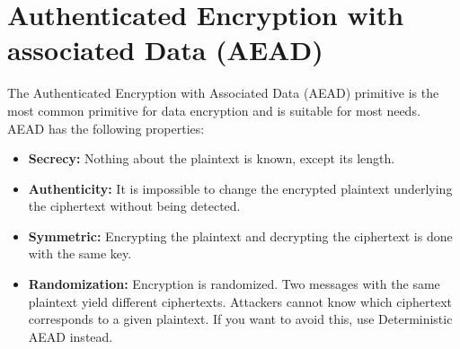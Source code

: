 \section*{Authenticated Encryption with associated Data (AEAD)}
The Authenticated Encryption with Associated Data (AEAD) primitive is the most common primitive for data encryption and is suitable for most needs. \cite{GoogleTinkAEAD}
\newline
AEAD has the following properties: \newline
\begin{itemize}
    \item \textbf{Secrecy:} Nothing about the plaintext is known, except its length.
    \item \textbf{Authenticity:} It is impossible to change the encrypted plaintext underlying the ciphertext without being detected.
    \item \textbf{Symmetric:} Encrypting the plaintext and decrypting the ciphertext is done with the same key.
    \item \textbf{Randomization:} Encryption is randomized. Two messages with the same plaintext yield different ciphertexts. Attackers cannot know which ciphertext corresponds to a given plaintext. If you want to avoid this, use Deterministic AEAD instead.
\end{itemize}
\cite{GoogleTinkAEAD}


